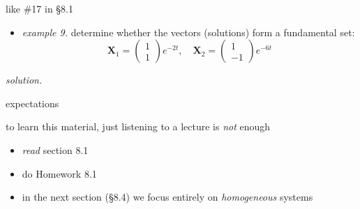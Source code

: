 \documentclass[dvipsnames,colorlinks]{beamer}
\newcommand{\bX}{\mathbf{X}}
\begin{document}
\begin{frame}{like \#17 in \S8.1}

\begin{itemize}
\item \emph{example 9.}  determine whether the vectors (solutions) form a fundamental set:
    $$\bX_1 = \begin{pmatrix} 1 \\ 1 \end{pmatrix} e^{-2t}, \quad \bX_2 = \begin{pmatrix} 1 \\ -1 \end{pmatrix} e^{-6t}$$
\end{itemize}

\noindent \emph{solution.}

\vspace{40mm}
\end{frame}


\begin{frame}{expectations}

to learn this material, just listening to a lecture is \emph{not} enough
     \begin{itemize}
     \item \emph{read} section 8.1
     \item do Homework 8.1
     \item in the next section (\S8.4) we focus entirely on \emph{homogeneous} systems
     \end{itemize}
\end{frame}
\end{document}
